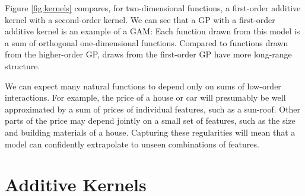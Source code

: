 Figure \ref{fig:kernels} compares, for two-dimensional functions, a first-order additive kernel with a second-order kernel. We can see that a GP with a first-order additive kernel is an example of a GAM:  Each function drawn from this model is a sum of orthogonal one-dimensional functions.  Compared to functions drawn from the higher-order GP, draws from the first-order GP have more long-range structure.



We can expect many natural functions to depend only on sums of low-order interactions.  For example, the price of a house or car will presumably be well approximated by a sum of prices of individual features, such as a sun-roof.  
Other parts of the price may depend jointly on a small set of features, such as the size and building materials of a house.
Capturing these regularities will mean that a model can confidently extrapolate to unseen combinations of features.





\section{Additive Kernels}


